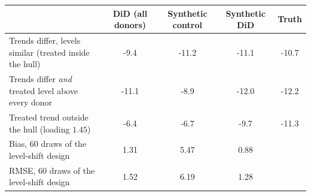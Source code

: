 \begin{tabular}{lcccc}\toprule
 & DiD (all donors) & Synthetic control & Synthetic DiD & Truth \\ \midrule
Trends differ, levels similar (treated inside the hull) & -9.4 & -11.2 & -11.1 & -10.7 \\
Trends differ \emph{and} treated level above every donor & -11.1 & -8.9 & -12.0 & -12.2 \\
Treated trend outside the hull (loading $1.45$) & -6.4 & -6.7 & -9.7 & -11.3 \\
\midrule Bias, 60 draws of the level-shift design & 1.31 & 5.47 & 0.88 &  \\
RMSE, 60 draws of the level-shift design & 1.52 & 6.19 & 1.28 &  \\
\bottomrule\end{tabular}
